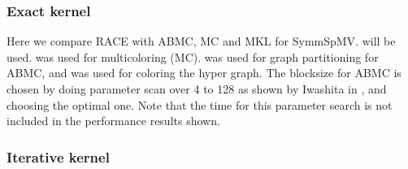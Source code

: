 

\subsubsection{Exact kernel}
Here we compare  \acrshort{RACE} with \acrshort{ABMC}, \acrshort{MC} and \acrshort{MKL} for \acrshort{SymmSpMV}.  will be used. \COLPACK \cite{COLPACK} %
was used for multicoloring (\acrshort{MC}). \METIS \cite{METIS}  was used for graph partitioning for \acrshort{ABMC}, and \COLPACK was used for coloring the hyper graph. The blocksize for \acrshort{ABMC} is chosen by doing parameter scan over 4 to 128 as shown by Iwashita \etal in \cite{ABMC}, and choosing the optimal one. Note that the time for this parameter search is not included in the performance results shown. 


\subsubsection{Iterative kernel}

